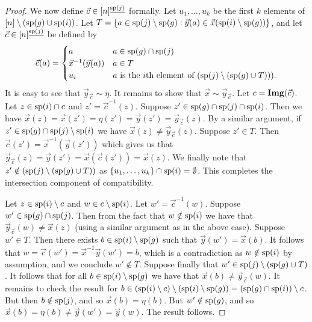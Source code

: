 \documentclass[../paper.tex]{subfiles}
\begin{document}
\begin{proof}
  We now define $\vec{c} \in [n]^{\underline{\text{sp}(j)}}$ formally. Let $u_1,
  \ldots , u_k$ be the first $k$ elements of $[n] \setminus (\text{sp}(g) \cup
  \text{sp}(i))$. 
  Let $T = \{a \in \text{sp}(j) \setminus \text{sp}(g) : \vec{y}(a) \in
  \vec{x}(\text{sp}(i) \setminus \text{sp}(g))\}$, and let $\vec{c} \in
  [n]^{\underline{\text{sp}(j)}}$ be defined by
	\[
		\vec{c} (a) =
		\begin{cases}
			a                        & a \in \text{sp}(g) \cap \text{sp}(j)                                     \\
			\vec{x}^{-1}(\vec{y}(a)) & a \in T                                                            \\
			u_{i} & \text{$a$ is the $i$th element of $(\text{sp}(j) \setminus (\text{sp}(g)
        \cup T)))$}.
		\end{cases}
	\]
	It is easy to see that $\vec{y}_{\vec{c}} \sim \eta$. It remains to show that
  $\vec{x} \sim \vec{y}_{\vec{c}}$. Let $c = \text{\textbf{Img}}(\vec{c})$. Let $z \in
  \text{sp}(i) \cap c$ and $z' = \vec{c}^{-1}(z)$. Suppose $z' \in \text{sp}(g)\cap
  \text{sp}(j) \cap \text{sp}(i)$. Then we have $\vec{x}(z) = \vec{x}(z') = \eta (z')
  = \vec{y}(z') = \vec{y}_{\vec{c}}(z)$. By a similar argument, if $z' \in
  \text{sp}(g) \cap \text{sp}(j) \setminus \text{sp}(i)$ we have $\vec{x}(z) \neq
  \vec{y}_{\vec{c}}(z)$. Suppose $z' \in T$. Then $\vec{c}(z') =
  \vec{x}^{-1}(\vec{y}(z'))$ which gives us that $\vec{y}_{\vec{c}}(z) =
  \vec{y}(z') = \vec{x}(\vec{c}(z')) = \vec{x}(z)$. We finally note that $z'
  \notin (\text{sp}(j) \setminus (\text{sp}(g) \cup T))$ as $\{u_1 , \ldots , u_k\}
  \cap \text{sp}(i) = \emptyset$. This completes the intersection component of
  compatibility.
		
	Let $z \in \text{sp}(i) \setminus c$ and $w \in c \setminus \text{sp}(i)$. Let $w' =
  \vec{c}^{-1}(w)$. Suppose $w' \in \text{sp}(g) \cap \text{sp}(j)$. Then from the
  fact that $w \notin \text{sp}(i)$ we have that $\vec{y}_{\vec{c}}(w) \neq
  \vec{x}(z)$ (using a similar argument as in the above case). Suppose $w' \in
  T$. Then there exists $b \in \text{sp}(i) \setminus \text{sp}(g)$ such that
  $\vec{y}(w') = \vec{x}(b)$. It follows that $w = \vec{c}(w') =
  \vec{x}^{-1}\vec{y} (w') = b$, which is a contradiction as $w \notin
  \text{sp}(i)$ by assumption, and we conclude $w' \notin T$. Suppose finally that
  $w' \in \text{sp}(j) \setminus (\text{sp}(g) \cup T)$. It follows that for all $b
  \in \text{sp}(i) \setminus \text{sp}(g)$ we have that $\vec{x}(b) \neq
  \vec{y}_{\vec{c}}(w)$. It remains to check the result for $b \in (\text{sp}(i)
  \setminus c) \setminus (\text{sp}(i) \setminus \text{sp}(g)) = (\text{sp}(g) \cap
  \text{sp}(i)) \setminus c$. But then $b \notin \text{sp}(j)$, and so $\vec{x}(b) =
  \eta (b)$. But $w' \notin \text{sp}(g)$, and so $\vec{x}(b) = \eta(b) \neq
  \vec{y}(w') = \vec{y}(w)$. The result follows.
\end{proof}
\end{document}
